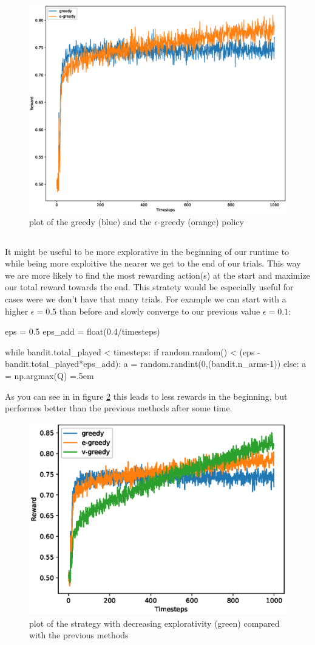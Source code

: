 \documentclass[11pt,a4paper]{article}
\newenvironment{lcverbatim}
 {\SaveVerbatim{cverb}}
 {\endSaveVerbatim
  \flushleft\fboxrule=0pt\fboxsep=.5em
  \colorbox{cverbbg}{%
    \makebox[\dimexpr\linewidth-2\fboxsep][l]{\BUseVerbatim{cverb}}%
  }
  \endflushleft
}
\begin{document}
\begin{figure}[h!]
    \includegraphics[width=.7\textwidth]{fig_esp_greedy.eps}
    \centering
    \caption{plot of the greedy (blue) and the $\epsilon$-greedy (orange) policy}
    \label{fig1}
\end{figure}

\subsection{}

It might be useful to be more explorative in the beginning of our runtime to while being more exploitive 
the nearer we get to the end of our trials. This way we are more likely to find the most rewarding 
action(s) at the start and maximize our total reward towards the end. \newline
This stratety would be especially useful for cases were we don't have that many trials. \newline
For example we can start with a higher $\epsilon=0.5$ than before and slowly converge to our previous 
value $\epsilon=0.1$: \newpage

\begin{center}
    \begin{lcverbatim}
        eps = 0.5
        eps_add = float(0.4/timesteps)

        while bandit.total_played < timesteps:
            if random.random() < (eps - bandit.total_played*eps_add):
                a = random.randint(0,(bandit.n_arms-1))
            else:
                a = np.argmax(Q)
    \end{lcverbatim}
\end{center}


\flushleft As you can see in in figure \ref{fig2} this leads to less rewards in the beginning, but performes better
than the previous methods after some time.

\begin{figure}[h!]
    \includegraphics[width=.7\textwidth]{fig_experimental.eps}
    \centering
    \caption{plot of the strategy with decreasing explorativity (green) compared with the previous methods}
    \label{fig2}
\end{figure}
\end{document}
